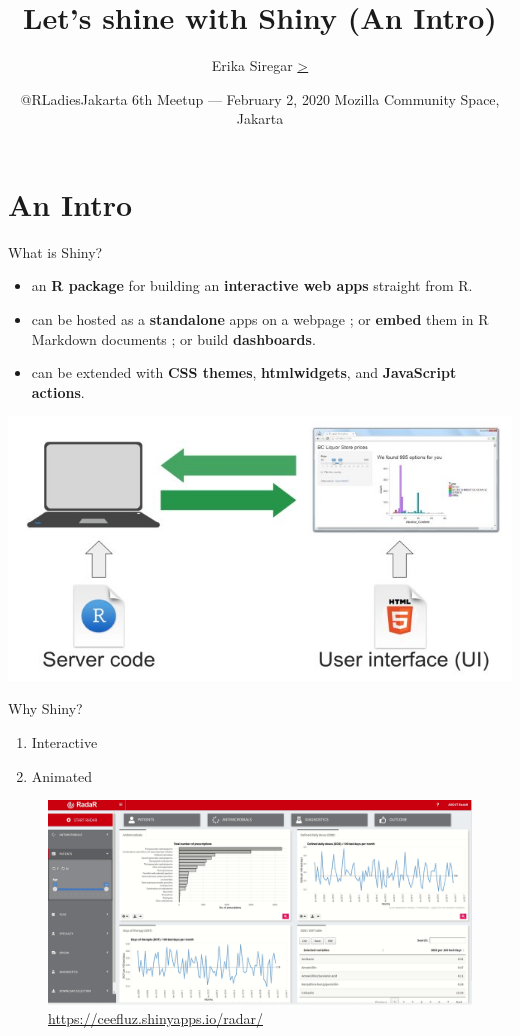 \documentclass[
  ignorenonframetext,
]{beamer}
\title{Let's shine with Shiny (An Intro)}
\author{Erika Siregar
\href{https://twitter.com/erikaris}{\textless@erikaris\textgreater{}}}
\date{@RLadiesJakarta 6th Meetup --- February 2, 2020 Mozilla Community Space,
Jakarta}
\providecommand{\tightlist}{%
  \setlength{\itemsep}{0pt}\setlength{\parskip}{0pt}}
\begin{document}
\frame{\titlepage}

\hypertarget{an-intro}{%
\section{An Intro}\label{an-intro}}

\begin{frame}{What is Shiny?}
\protect\hypertarget{what-is-shiny}{}

\begin{itemize}[<+->]
\tightlist
\item
  an \textbf{R package} for building an \textbf{interactive web apps}
  straight from R.
\item
  can be hosted as a \textbf{standalone} apps on a webpage ; or
  \textbf{embed} them in R Markdown documents ; or build
  \textbf{dashboards}.
\item
  can be extended with \textbf{CSS themes}, \textbf{htmlwidgets}, and
  \textbf{JavaScript actions}.
\end{itemize}

\includegraphics[width=1\textwidth,height=\textheight]{images/shiny.jpg}

\end{frame}

\begin{frame}{Why Shiny?}
\protect\hypertarget{why-shiny}{}

\begin{enumerate}[<+->]
\tightlist
\item
  Interactive
\item
  Animated
\end{enumerate}

\begin{figure}
\centering
\includegraphics{images/radar.gif}
\caption{\url{https://ceefluz.shinyapps.io/radar/}}
\end{figure}

\end{frame}
\end{document}
